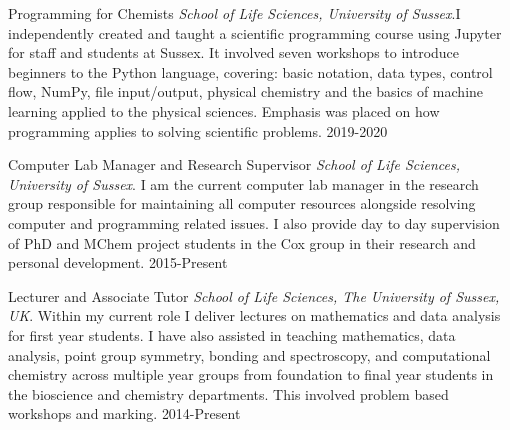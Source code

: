 



\begin{cvhonors}


\cvhonor
{Programming for Chemists} %
{\textit{School of Life Sciences, University of Sussex}.\newline I independently created and taught a scientific programming course using Jupyter for staff and students at Sussex. It involved seven workshops to introduce beginners to the Python language, covering: basic notation, data types, control flow, NumPy, file input/output, physical chemistry and the basics of machine learning applied to the physical sciences. Emphasis was placed on how programming applies to solving scientific problems.} %
{} %
{2019-2020} %


\cvhonor
{Computer Lab Manager and Research Supervisor} %
{\textit{School of Life Sciences, University of Sussex}. \newline I am the current computer lab manager in the research group responsible for maintaining all computer resources alongside resolving computer and programming related issues. I also provide day to day supervision of PhD and MChem project students in the Cox group in their research and personal development.} %
{} %
{2015-Present} %


\cvhonor
{Lecturer and Associate Tutor} %
{\textit{School of Life Sciences, The University of Sussex, UK}. \newline Within my current role I deliver lectures on mathematics and data analysis for first year students. I have also assisted in teaching mathematics, data analysis, point group symmetry, bonding and spectroscopy, and computational chemistry across multiple year groups from foundation to final year students in the bioscience and chemistry departments. This involved problem based workshops and marking.} %
{} %
{2014-Present} %


\end{cvhonors}
